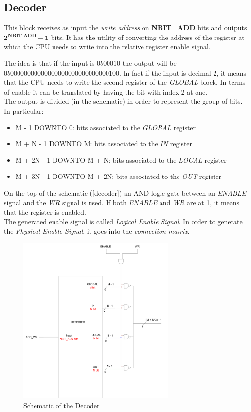 \subsection{Decoder}
This block receives as input the \emph{write address} on \textbf{NBIT\_ADD} bits and outputs \(\mathbf{2^{NBIT\_ADD} - 1} \) bits. It has the utility of converting the address of the register at which the CPU needs to write into the relative register enable signal. 

The idea is that if the input is \(0b00010\) the output will be \(0b00000000000000000000000000000100\). In fact if the input is decimal 2, it means that the CPU needs to write the second register of the \emph{GLOBAL} block. In terms of enable it can be translated by having the bit with index 2 at one. \\

The output is divided (in the schematic) in order to represent the group of bits. In particular: 
\begin{itemize}
    \item M - 1 DOWNTO 0: bits associated to the \emph{GLOBAL} register
    \item M + N - 1 DOWNTO M: bits associated to the \emph{IN} register
    \item M + 2N - 1 DOWNTO M + N: bits associated to the \emph{LOCAL} register
    \item M + 3N - 1 DOWNTO M + 2N: bits associated to the \emph{OUT} register
\end{itemize}

On the top of the schematic (\autoref{decoder}) an AND logic gate between an \emph{ENABLE} signal and the \emph{WR} signal is used. If both \emph{ENABLE} and \emph{WR} are at 1, it means that the register is enabled.\\

The generated enable signal is called \emph{Logical Enable Signal}. In order to generate the \emph{Physical Enable Signal}, it goes into the \emph{connection matrix}.

\begin{figure}[H]
    \centering
    \includegraphics[width=0.7\textwidth]{chapters/4_DecodeStage/images/Decoder.pdf}
    \caption{Schematic of the Decoder}
    \label{decoder}
\end{figure}

